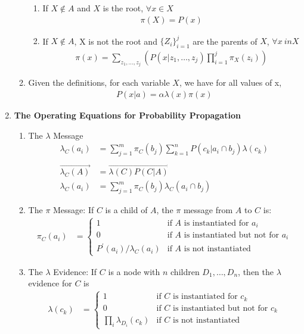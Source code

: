 \documentclass[12pt,twoside]{article}
\begin{document}
\begin{enumerate}
\begin{enumerate}
\begin{enumerate}
\item If $X\notin A$ and $X$ is the root, $\forall x\in X $
\begin{align*}
\pi(X) = P(x)
\end{align*}

\item If $X\notin A$, X is not the root and $\lbrace Z_i \rbrace_{i=1}^j$ are the parents of $X$, $\forall x \ in X$
\begin{align*}
\pi(x) = \sum_{z_1,\dots, z_j} \left(P(x\vert z_1,\dots, z_j) \prod_{i=1}^j \pi_X(z_i)\right)
\end{align*}

\end{enumerate}
\item Given the definitions, for each variable $X$, we have for all values of x,
\begin{align*}
P(x\vert a) = \alpha \lambda(x) \pi(x)
\end{align*}

\end{enumerate}

\item \textbf{The Operating Equations for Probability Propagation}
\begin{enumerate}
\item {The $\lambda$ Message}
\begin{align*}
\lambda_C(a_i)& = \sum_{j=1}^m \pi_C(b_j) \sum_{k=1}^n P(c_k \vert a_i \cap b_j)\lambda(c_k)\\
&\\
\vec{\lambda_C(A)}&=\vec{\lambda(C)P(C\vert A)}\\
\lambda_C(a_i)& = \sum_{j=1}^m \pi_C(b_j) \lambda_C(a_i \cap b_j)
\end{align*}


\item {The $\pi$ Message:} If $C$ is a child of $A$, the $\pi$ message from $A$ to $C$ is:
\begin{align*}
\pi_C(a_i) & = \begin{cases}
1 													& \text{if $A$ is instantiated for $a_i$} \\
0 													& \text{if $A$ is instantiated but not for $a_i$} \\
P^\prime(a_i)/\lambda_C(a_i)		 	& \text{if $A$ is not instantiated}
\end{cases}
\end{align*}


\item {The $\lambda$ Evidence:} If $C$ is a node with $n$ children $D_1, \dots, D_n$, then the $\lambda$ evidence for $C$ is
\begin{align*}
\lambda(c_k) &=\begin{cases}
1											& \text{if $C$ is instantiated for $c_k$}\\
0											& \text{if $C$ is instantiated but not for $c_k$}\\
\prod_i \lambda_{D_i}(c_k)	& \text{if $C$ is not instantiated}
\end{cases}
\end{align*}


\end{enumerate}
\end{enumerate}
\end{document}
